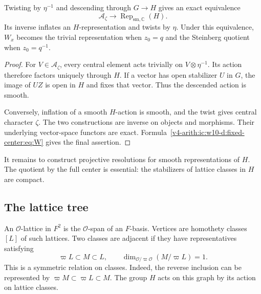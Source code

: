 \begin{lemma}\label{v4-arith:ic:w10-d:fixed-center:lem:twist}
Twisting by $\eta^{-1}$ and descending through $G\to H$ gives an exact equivalence
\[
 \mathcal A_\zeta\longrightarrow\operatorname{Rep}_{\mathrm{sm},\mathbb C}(H).
\]
Its inverse inflates an $H$-representation and twists by $\eta$.
Under this equivalence, $W_x$ becomes the trivial representation when $z_0=q$
and the Steinberg quotient when $z_0=q^{-1}$.
\end{lemma}
\begin{proof}
For $V\in\mathcal A_\zeta$, every central element acts trivially on $V\otimes\eta^{-1}$.
Its action therefore factors uniquely through $H$.
If a vector has open stabilizer $U$ in $G$, the image of $UZ$ is open in $H$ and fixes that vector.
Thus the descended action is smooth.

Conversely, inflation of a smooth $H$-action is smooth, and the twist gives central character $\zeta$.
The two constructions are inverse on objects and morphisms.
Their underlying vector-space functors are exact.
Formula~\eqref{v4-arith:ic:w10-d:fixed-center:eq:W} gives the final assertion.
\end{proof}

It remains to construct projective resolutions for smooth representations of $H$.
The quotient by the full center is essential: the stabilizers of lattice classes in $H$ are compact.

\subsection{The lattice tree}

An $\mathcal O$-lattice in $F^2$ is the $\mathcal O$-span of an $F$-basis.
Vertices are homothety classes $[L]$ of such lattices.
Two classes are adjacent if they have representatives satisfying
\[
 \varpi L\subset M\subset L,\qquad
 \dim_{\mathcal O/\varpi\mathcal O}(M/\varpi L)=1.
\]
This is a symmetric relation on classes.
Indeed, the reverse inclusion can be represented by
$\varpi M\subset\varpi L\subset M$.
The group $H$ acts on this graph by its action on lattice classes.

